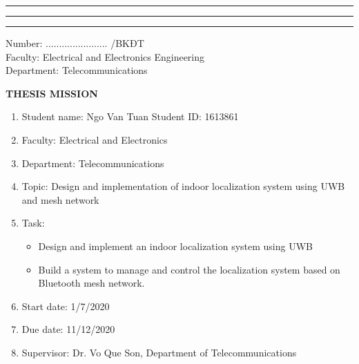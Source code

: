 \documentclass[\main/main.tex]{subfiles}
\begin{document}
\graphicspath{{imgs/}{00_misc/imgs/}}


\rule{\textwidth}{1pt}
\begin{minipage}{0.45\textwidth}
    \vspace{3mm}
    \begin{center}
        \fontsize{7}{12}\selectfont{VIETNAM NATIONAL UNIVERSITY HO CHI MINH CITY\\
                 HO CHI MINH CITY UNIVERSITY OF TECHNOLOGY\\}
    \rule{\textwidth}{1pt}
    \end{center}
\end{minipage}
\hfill
\begin{minipage}{0.45\textwidth}
    \vspace{3mm}
    \begin{center}
        \fontsize{7}{12}\selectfont{SOCIALIST REPUBLIC OF VIETNAM\\
    INDEPENDENCE-FREEDOM-HAPPINESS\\}
    \rule{\textwidth}{1pt}
    \end{center}
\end{minipage}

\begin{flushleft}
    \parbox[t][1.5cm]{10cm}
    {
        Number: ....................... /BKĐT \\
        Faculty: Electrical and Electronics Engineering \\
        Department: Telecommunications
    }
\end{flushleft}

\vspace{3mm}
\begin{center}
    \textbf{THESIS MISSION}
\end{center}
\vspace{3mm}

\begin{enumerate}
    \item Student name: Ngo Van Tuan \hspace{3cm} Student ID: 1613861
    \item Faculty: Electrical and Electronics
    \item Department: Telecommunications
    \item Topic: Design and implementation of indoor localization system using UWB and mesh network 
    \item Task: \begin{itemize}
        \item Design and implement an indoor localization system using UWB
        \item Build a system to manage and control the localization system based on Bluetooth mesh network.
    \end{itemize}
    \item Start date: 1/7/2020
    \item Due date: 11/12/2020
    \item Supervisor: Dr. Vo Que Son, Department of Telecommunications
\end{enumerate}
\end{document}
